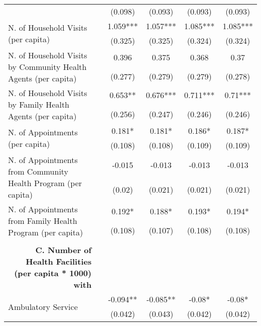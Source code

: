 \begin{table}[H]
\begin{footnotesize}
\begin{center}
{\begin{threeparttable}[b]
\begin{tabular}{rrcccr}
          &       & (0.098) & (0.093) & (0.093) & \multicolumn{1}{c}{(0.093)} \\
    \multicolumn{1}{l}{\multirow{2}[0]{*}{N. of Household Visits (per capita)}} &       & 1.059*** & 1.057*** & 1.085*** & \multicolumn{1}{c}{1.085***} \\
          &       & (0.325) & (0.325) & (0.324) & \multicolumn{1}{c}{(0.324)} \\
    \multicolumn{1}{l}{\multirow{2}[0]{*}{N. of Household Visits by Community Health Agents (per capita)}} &       & 0.396 & 0.375 & 0.368 & \multicolumn{1}{c}{0.37} \\
          &       & (0.277) & (0.279) & (0.279) & \multicolumn{1}{c}{(0.278)} \\
    \multicolumn{1}{l}{\multirow{2}[0]{*}{N. of Household Visits by Family Health Agents (per capita)}} &       & 0.653** & 0.676*** & 0.711*** & \multicolumn{1}{c}{0.71***} \\
          &       & (0.256) & (0.247) & (0.246) & \multicolumn{1}{c}{(0.246)} \\
    \multicolumn{1}{l}{\multirow{2}[0]{*}{N. of Appointments (per capita)}} &       & 0.181* & 0.181* & 0.186* & \multicolumn{1}{c}{0.187*} \\
          &       & (0.108) & (0.108) & (0.109) & \multicolumn{1}{c}{(0.109)} \\
    \multicolumn{1}{l}{\multirow{2}[0]{*}{N. of Appointments from Community Health Program (per capita)}} &       & -0.015 & -0.013 & -0.013 & \multicolumn{1}{c}{-0.013} \\
          &       & (0.02) & (0.021) & (0.021) & \multicolumn{1}{c}{(0.021)} \\
    \multicolumn{1}{l}{\multirow{2}[0]{*}{N. of Appointments from Family Health Program (per capita)}} &       & 0.192* & 0.188* & 0.193* & \multicolumn{1}{c}{0.194*} \\
          &       & (0.108) & (0.107) & (0.108) & \multicolumn{1}{c}{(0.108)} \\
          &       &       &       &       &  \\
    \midrule
    \multicolumn{1}{p{23.645em}}{\textbf{C. Number of Health Facilities (per capita * 1000) with}} &       &       &       &       &  \\
    \multicolumn{1}{l}{\multirow{2}[0]{*}{Ambulatory Service}} &       & -0.094** & -0.085** & -0.08* & \multicolumn{1}{c}{ -0.08* } \\
          &       & (0.042) & (0.043) & (0.042) & \multicolumn{1}{c}{ (0.042) } \\

\end{tabular}
\end{threeparttable}}
\end{center}
\end{footnotesize}
\end{table}
